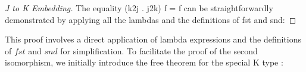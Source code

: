 \begin{proof}[J to K Embedding]
The equality (k2j . j2k) f = f can be straightforwardly demonstrated by applying all the 
lambdas and the definitions of fst and snd:

\resethooks

\end{proof}

This proof involves a direct application of lambda expressions and the definitions of 
$fst$ and $snd$ for simplification. To facilitate the proof of the second isomorphism, we 
initially introduce the free theorem for the special K type \cite{wadler1989theorems}:

